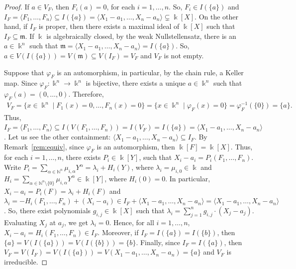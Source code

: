 \documentclass[11pt,reqno]{amsart}
\theoremstyle{definition}
\newcommand{\mbk}{\mbox{$\Bbbk$}}
\newcommand{\mfm}{\mbox{$\mathfrak{m}$}}
\begin{document}
\begin{proof}
If $a\in V_F$, then $F_i(a)=0$, for each $i=1,\ldots,n$. So, $F_i\in I(\{a\})$ and
$I_F=\langle F_1,\ldots,F_n\rangle \subseteq I(\{a\})=
\langle X_1-a_1,\ldots,X_n-a_n\rangle\subsetneq\mbk[X]$. On the other hand, 
if $I_F$ is proper, then there exists a maximal ideal of $\mbk[X]$ such that 
$I_F\subseteq \mfm$. If $\mbk$ is algebraically closed, by the weak Nullstellensatz, 
there is an $a\in\mbk^n$ such that
$\mfm=\langle X_1-a_1,\ldots,X_n-a_n\rangle=I(\{a\})$. 
So, $a\in V(I(\{a\}))=V(\mfm)\subseteq V(I_F)=V_F$ and $V_F$ is not empty. 

Suppose that
$\varphi_F$ is an automorphism, in particular, by the chain rule, a Keller map. 
Since $\varphi_F:\mbk^n\to\mbk^n$ is bijective, there exists a unique $a\in\mbk^n$ such that
$\varphi_F(a)=(0,\ldots,0)$. Therefore, 
\begin{eqnarray*}
V_F=\{x\in\mbk^n\mid F_1(x)=0,\ldots,F_n(x)=0\}=\{x\in\mbk^n\mid \varphi_F(x)=0\}=
\varphi_F^{-1}(\{0\})=\{a\}.
\end{eqnarray*}
Thus, $I_{F}=\langle F_1,\ldots , F_n\rangle\subseteq I(V(F_1,\ldots,F_n))=I(V_F)=
I(\{a\})=\langle X_1-a_1,\dots,X_n-a_n\rangle$. Let us see the other containment: 
$\langle X_1-a_1,\dots,X_n-a_n\rangle\subseteq I_F$. By Remark~\ref{rem:equiv}, since
$\varphi_F$ is an automorphism, then $\mbk[F]=\mbk[X]$. Thus, for each $i=1,\ldots, n$, there exists $P_i\in\mbk[Y]$, such that
$X_i-a_i=P_i(F_1,\ldots,F_n)$. Write
$P_i=\sum_{\alpha\in\mathbb{N}^n}\mu_{i,\alpha}Y^{\alpha}=\lambda_i+H_i(Y)$, where
$\lambda_i=\mu_{i,0}\in\mbk$ and 
$H_i=\sum_{\alpha\in\mathbb{N}^n\setminus\{0\}}\mu_{i,\alpha}Y^{\alpha}\in\mbk[Y]$, where 
$H_i(0)=0$. In particular, $X_i-a_i=P_i(F)=\lambda_i+H_i(F)$ and 
$\lambda_i=-H_i(F_1,\dots,F_n)+(X_i-a_i)\in I_F+\langle X_1-a_1,\ldots,X_n-a_n\rangle=
\langle X_1-a_1,\ldots,X_n-a_n\rangle$. So, there exist polynomials
$g_{i,j}\in\mbk[X]$ such that 
$\lambda_i=\sum_{j=1}^ng_{i,j}\cdot (X_j-a_j)$. Evaluating $X_j$ at $a_j$, we get
$\lambda_i=0$. Hence, for all $i=1,\dots,n$,  $X_i-a_i=H_i(F_1,\dots,F_n)\in I_F$.
Moreover, if $I_F=I(\{a\})=I(\{b\})$, then
$\{a\}=V(I(\{a\}))=V(I(\{b\}))=\{b\}$. Finally, since $I_F=I(\{a\})$, then
$V_F=V(I_F)=V(I(\{a\}))=V(X_1-a_1,\ldots,X_n-a_n)=\{a\}$ and $V_F$ is irreducible. 


\end{proof}
\end{document}
